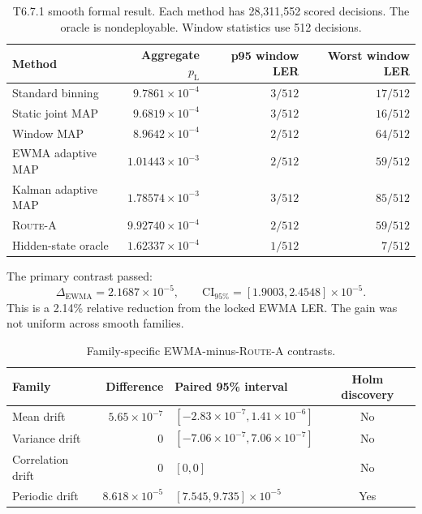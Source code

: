 \documentclass[11pt]{article}
\newcommand{\RouteA}{\textsc{Route-A}}
\newcommand{\pL}{p_{\mathrm L}}
\begin{document}
\begin{table}[htbp]
\centering
\small
\caption{T6.7.1 smooth formal result.  Each method has 28,311,552 scored
decisions.  The oracle is nondeployable.  Window statistics use 512 decisions.}
\label{tab:smooth-methods}
\begin{tabular}{@{}l r r r@{}}
\toprule
Method & Aggregate $\pL$ & p95 window LER & Worst window LER \\
\midrule
Standard binning & $9.7861\times10^{-4}$ & $3/512$ & $17/512$ \\
Static joint MAP & $9.6819\times10^{-4}$ & $3/512$ & $16/512$ \\
Window MAP & $8.9642\times10^{-4}$ & $2/512$ & $64/512$ \\
EWMA adaptive MAP & $1.01443\times10^{-3}$ & $2/512$ & $59/512$ \\
Kalman adaptive MAP & $1.78574\times10^{-3}$ & $3/512$ & $85/512$ \\
\RouteA{} & $9.92740\times10^{-4}$ & $2/512$ & $59/512$ \\
Hidden-state oracle & $1.62337\times10^{-4}$ & $1/512$ & $7/512$ \\
\bottomrule
\end{tabular}
\end{table}

The primary contrast passed:
\begin{equation}
  \Delta_{\mathrm{EWMA}}
  =2.1687\times10^{-5},\qquad
  \mathrm{CI}_{95\%}=[1.9003,2.4548]\times10^{-5}.
\end{equation}
This is a 2.14\% relative reduction from the locked EWMA LER.  The gain was not
uniform across smooth families.

\begin{table}[htbp]
\centering
\small
\caption{Family-specific EWMA-minus-\RouteA{} contrasts.}
\label{tab:smooth-families}
\begin{tabular}{@{}l r l c@{}}
\toprule
Family & Difference & Paired 95\% interval & Holm discovery \\
\midrule
Mean drift & $5.65\times10^{-7}$ & $[-2.83\times10^{-7},1.41\times10^{-6}]$ & No \\
Variance drift & $0$ & $[-7.06\times10^{-7},7.06\times10^{-7}]$ & No \\
Correlation drift & $0$ & $[0,0]$ & No \\
Periodic drift & $8.618\times10^{-5}$ & $[7.545,9.735]\times10^{-5}$ & Yes \\
\bottomrule
\end{tabular}
\end{table}
\end{document}
